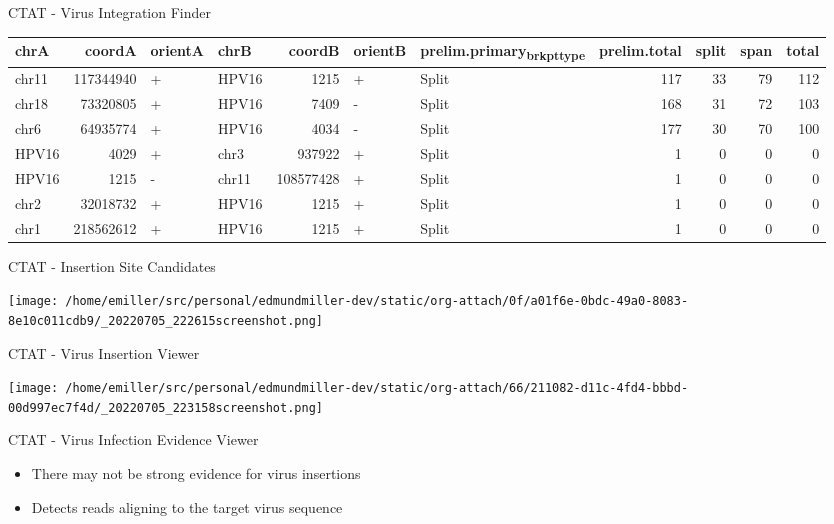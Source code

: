 \documentclass[bigger]{beamer}
\begin{document}
\begin{frame}[label={sec:orgd810fd9}]{CTAT - Virus Integration Finder}
\footnotesize
\begin{center}
\begin{tabular}{lrllrllrrrr}
chrA & coordA & orientA & chrB & coordB & orientB & prelim.primary\textsubscript{brkpt}\textsubscript{type} & prelim.total & split & span & total\\
\hline
chr11 & 117344940 & + & HPV16 & 1215 & + & Split & 117 & 33 & 79 & 112\\
chr18 & 73320805 & + & HPV16 & 7409 & - & Split & 168 & 31 & 72 & 103\\
chr6 & 64935774 & + & HPV16 & 4034 & - & Split & 177 & 30 & 70 & 100\\
HPV16 & 4029 & + & chr3 & 937922 & + & Split & 1 & 0 & 0 & 0\\
HPV16 & 1215 & - & chr11 & 108577428 & + & Split & 1 & 0 & 0 & 0\\
chr2 & 32018732 & + & HPV16 & 1215 & + & Split & 1 & 0 & 0 & 0\\
chr1 & 218562612 & + & HPV16 & 1215 & + & Split & 1 & 0 & 0 & 0\\
\end{tabular}
\end{center}
\end{frame}


\begin{frame}[label={sec:org458dba5}]{CTAT - Insertion Site Candidates}
\begin{center}
\texttt{[image: /home/emiller/src/personal/edmundmiller-dev/static/org-attach/0f/a01f6e-0bdc-49a0-8083-8e10c011cdb9/\_20220705\_222615screenshot.png]}
\end{center}
\end{frame}


\begin{frame}[label={sec:org76567ff}]{CTAT - Virus Insertion Viewer}
\begin{center}
\texttt{[image: /home/emiller/src/personal/edmundmiller-dev/static/org-attach/66/211082-d11c-4fd4-bbbd-00d997ec7f4d/\_20220705\_223158screenshot.png]}
\end{center}
\end{frame}

\begin{frame}[label={sec:org0fb62ef}]{CTAT - Virus Infection Evidence Viewer}
\begin{itemize}
\item There may not be strong evidence for virus insertions
\item Detects reads aligning to the target virus sequence
\end{itemize}
\end{frame}
\end{document}
